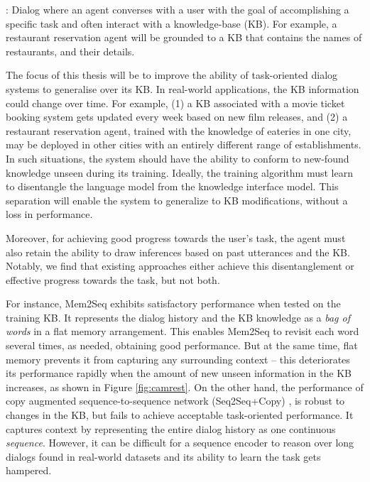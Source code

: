 : Dialog where an agent converses with a user with the goal of accomplishing a specific task and often interact with a knowledge-base (KB). For example, a restaurant reservation agent \cite{hen2014word} will be grounded to a KB that contains the names of restaurants, and their details.  

The focus of this thesis will be to improve the ability of task-oriented dialog systems to generalise over its KB.
In real-world applications, the KB information could change over time. For example, (1) a KB associated with a movie ticket booking system gets updated every week based on new film releases, and (2) a restaurant reservation agent, trained with the knowledge of eateries in one city, may be deployed in other cities with an entirely different range of establishments. In such situations, the system should have the ability to conform to new-found knowledge unseen during its training. Ideally, the training algorithm must learn to disentangle the language model from the knowledge interface model. This separation will enable the system to generalize to KB modifications, without a loss in performance.  

Moreover, for achieving good progress towards the user's task, the agent must also retain the ability to draw inferences based on past utterances and the KB. Notably, we find that existing approaches either achieve this disentanglement or effective progress towards the task, but not both.  

For instance, Mem2Seq \cite{mem2seq} exhibits satisfactory performance when tested on the training KB. It represents the dialog history and the KB knowledge as a \emph{bag of words} in a flat memory arrangement. This enables Mem2Seq to revisit each word several times, as needed, obtaining good performance. But at the same time, flat memory prevents it from capturing any surrounding context -- this deteriorates its performance rapidly when the amount of new unseen information in the KB increases, as shown in Figure \ref{fig:camrest}. On the other hand, the performance of copy augmented sequence-to-sequence network (Seq2Seq+Copy) \cite{eric2017copy}, is robust to changes in the KB, but fails to achieve acceptable task-oriented performance. It captures context by representing the entire dialog history as one continuous \emph{sequence}.
However, it can be difficult for a sequence encoder to reason over long dialogs found in real-world datasets and its ability to learn the task gets hampered.  

